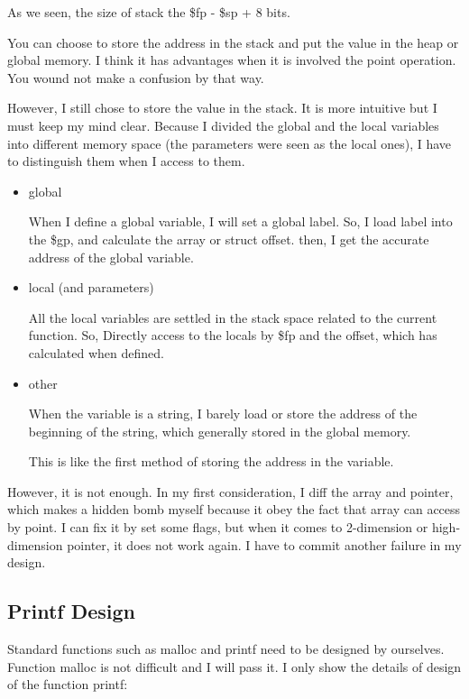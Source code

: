 \documentclass[preprint, 9pt]{sigplanconf}
\begin{document}
    As we seen, the size of stack the \$fp - \$sp + 8 bits.

    You can choose to store the address in the stack and put the value in the heap or global memory.
    I think it has advantages when it is involved the point operation.
    You wound not make a confusion by that way.

    However, I still chose to store the value in the stack.
    It is more intuitive but I must keep my mind clear.
    Because I divided the global and the local variables into different memory space (the parameters were seen as the local ones), I have to distinguish them when I access to them.
    \begin{itemize}
        \item{global}

            When I define a global variable, I will set a global label.
            So, I load label into the \$gp, and calculate the array or struct offset.
            then, I get the accurate address of the global variable.

        \item{local (and parameters)}

            All the local variables are settled in the stack space related to the current function.
            So, Directly access to the locals by \$fp and the offset, which has calculated when defined.

        \item{other}

            When the variable is a string, I barely load or store the address of the beginning of the string, which generally stored in the global memory.

            This is like the first method of storing the address in the variable.
    \end{itemize}

    However, it is not enough.
    In my first consideration, I diff the array and pointer, which makes a hidden bomb myself because it obey the fact that array can access by point.
    I can fix it by set some flags, but when it comes to 2-dimension or high-dimension pointer, it does not work again.
    I have to commit another failure in my design.

    \subsection{Printf Design}
    Standard functions such as malloc and printf need to be designed by ourselves.
    Function malloc is not difficult and I will pass it.
    I only show the details of design of the function printf:
\end{document}
